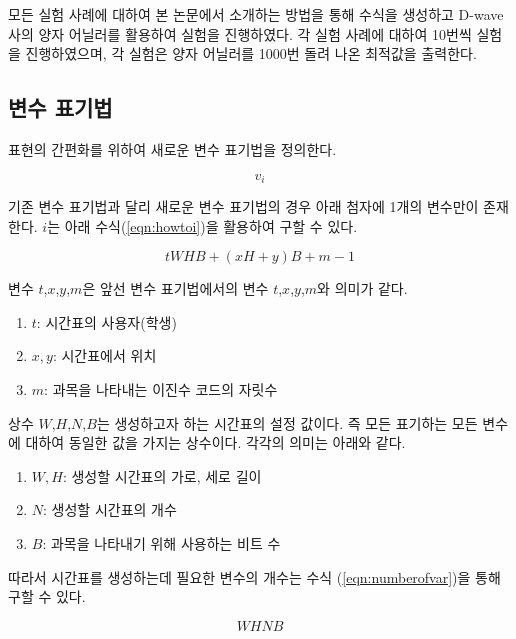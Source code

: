 \documentclass{article}
\begin{document}
모든 실험 사례에 대하여 본 논문에서 소개하는 방법을 통해 수식을 생성하고 D-wave사의 양자 어닐러를 활용하여 실험을 진행하였다. 각 실험 사례에 대하여 10번씩 실험을 진행하였으며, 각 실험은 양자 어닐러를 1000번 돌려 나온 최적값을 출력한다.

    \subsection{변수 표기법}

표현의 간편화를 위하여 새로운 변수 표기법을 정의한다.

    \begin{equation}\label{eqn:newvar}
        v_{i}
    \end{equation}

기존 변수 표기법과 달리 새로운 변수 표기법의 경우 아래 첨자에 1개의 변수만이 존재한다. $i$는 아래 수식(\ref{eqn:howtoi})을 활용하여 구할 수 있다.

    \begin{equation}\label{eqn:howtoi}
        tWHB+(xH+y)B+m-1
    \end{equation}

변수 $t$,$x$,$y$,$m$은 앞선 변수 표기법에서의 변수 $t$,$x$,$y$,$m$와 의미가 같다.

    \begin{enumerate}
        \item [] $t$: 시간표의 사용자(학생)
        \item [] $x,y$: 시간표에서 위치
        \item [] $m$: 과목을 나타내는 이진수 코드의 자릿수
    \end{enumerate}

상수 $W$,$H$,$N$,$B$는 생성하고자 하는 시간표의 설정 값이다. 즉 모든 표기하는 모든 변수에 대하여 동일한 값을 가지는 상수이다. 각각의 의미는 아래와 같다.

    \begin{enumerate}
        \item [] $W,H$: 생성할 시간표의 가로, 세로 길이
        \item [] $N$: 생성할 시간표의 개수
        \item [] $B$: 과목을 나타내기 위해 사용하는 비트 수
    \end{enumerate}

따라서 시간표를 생성하는데 필요한 변수의 개수는 수식 (\ref{eqn:numberofvar})을 통해 구할 수 있다.

    \begin{equation}\label{eqn:numberofvar}
        WHNB
    \end{equation}
\end{document}
